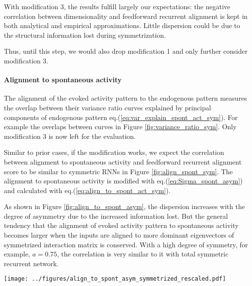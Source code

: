 \documentclass[11pt]{article}
\begin{document}
	With modification 3, the results fulfill largely our expectations: the negative correlation between dimensionality and feedforward recurrent alignment is kept in both analytical and empirical approximations. Little dispersion could be due to the structural information lost during symmetrization. 
	
	Thus, until this step, we would also drop modification 1 and only further consider modification 3. 
	
	\paragraph{Alignment to spontaneous activity}
	The alignment of the evoked activity pattern to the endogenous pattern measures the overlap between their variance ratio curves explained by principal components of endogenous pattern eq.(\ref{eq:var_explain_spont_act_sym}). For example the overlaps between curves in Figure \ref{fig:variance_ratio_sym}. Only modification 3 is now left for the evaluation. 
	
	Similar to prior cases, if the modification works, we expect the correlation between alignment to spontaneous activity and feedforward recurrent alignment score to be similar to symmetric RNNs in Figure \ref{fig:align_spont_sym}. The alignment to spontaneous activity is modified with eq.(\ref{eq:Sigma_spont_asym}) and calculated with eq.(\ref{eq:align_to_spont_act_sym}). 
	
	As shown in Figure \ref{fig:align_to_spont_asym}, the dispersion increases with the degree of asymmetry due to the increased information lost. But the general tendency that the alignment of evoked activity pattern to spontaneous activity becomes larger when the inputs are aligned to more dominant eigenvectors of symmetrized interaction matrix is conserved. With a high degree of symmetry, for example, $a = 0.75$, the correlation is very similar to it with total symmetric recurrent network.
	
	\begin{SCfigure}[0.9][h] 
		\centering
		\caption[Alignment to spontaneous activity with respect to the feedforward recurrent alignment and influence from the degree of symmetry  for asymmetric RNNs with symmetrized interactions]{\textbf{Alignment to spontaneous activity with respect to the feedforward recurrent alignment and influence from the degree of symmetry  for asymmetric RNNs with symmetrized interactions.} As a control group,a fully symmetric RNN ($a=1.0$) is represented with dark green dots. For different degrees of symmetry from $a = 0.75$ to $0$, the darker the dots' color, the more asymmetry is in the network. Only modification 3 is evaluated for alignment to spontaneous activity.}
		\texttt{[image: ../figures/align\_to\_spont\_asym\_symmetrized\_rescaled.pdf]}
		\label{fig:align_to_spont_asym}
	\end{SCfigure}
\end{document}
